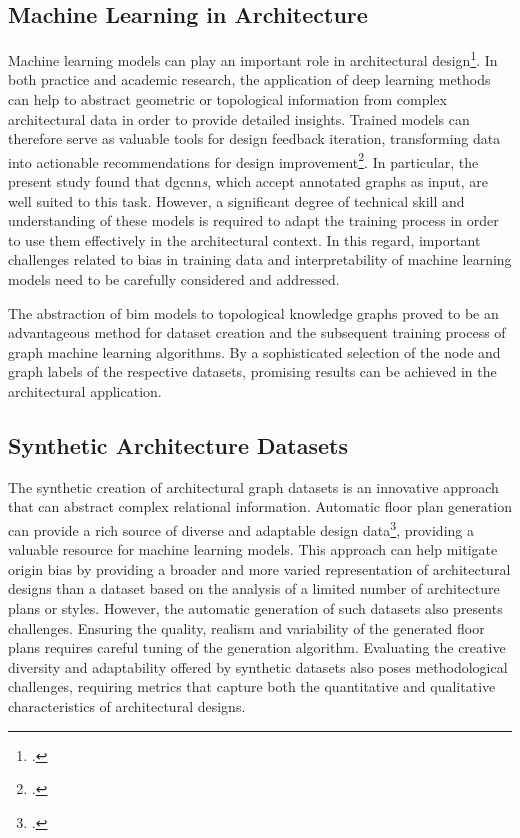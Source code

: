 \documentclass[a4paper, 12pt]{report}
\begin{document}
\subsection{Machine Learning in Architecture}\label{sec:machine-learning-in-architecture-conclusion}

Machine learning models can play an important role in architectural design\footcite{kiavarz2021room}. In both practice and academic research, the application of deep learning methods can help to abstract geometric or topological information from complex architectural data in order to provide detailed insights. Trained models can therefore serve as valuable tools for design feedback iteration, transforming data into actionable recommendations for design improvement\footcite{paterson2013real}. In particular, the present study found that \acrlong{dgcnn}\textit{s}, which accept annotated graphs as input, are well suited to this task. However, a significant degree of technical skill and understanding of these models is required to adapt the training process in order to use them effectively in the architectural context. In this regard, important challenges related to bias in training data and interpretability of machine learning models need to be carefully considered and addressed.

The abstraction of \acrshort{bim} models to topological \glspl{knowledge graph} proved to be an advantageous method for dataset creation and the subsequent training process of graph machine learning algorithms. By a sophisticated selection of the node and graph labels of the respective datasets, promising results can be achieved in the architectural application.

\subsection{Synthetic Architecture Datasets}\label{sec:synthetic-architecture-datasets-conclusion}

The synthetic creation of architectural graph datasets is an innovative approach that can abstract complex relational information. Automatic floor plan generation can provide a rich source of diverse and adaptable design data\footcite{carta2021self}, providing a valuable resource for machine learning models. This approach can help mitigate \gls{origin bias} by providing a broader and more varied representation of architectural designs than a dataset based on the analysis of a limited number of architecture plans or styles. However, the automatic generation of such datasets also presents challenges. Ensuring the quality, realism and variability of the generated floor plans requires careful tuning of the generation algorithm. Evaluating the creative diversity and adaptability offered by synthetic datasets also poses methodological challenges, requiring metrics that capture both the quantitative and qualitative characteristics of architectural designs.
\end{document}
